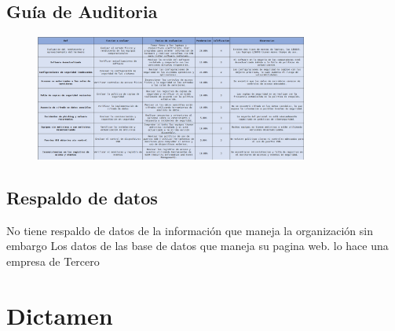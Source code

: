 \documentclass[12pt,a4paper]{article}
\begin{document}
\subsection{Guía de Auditoria }
\begin{figure}[!htb]
    \centering
    \includegraphics[width=0.8\textwidth]{images/guia.png}
    
\end{figure} 
\FloatBarrier 
\subsection{Respaldo de datos}
No tiene respaldo de datos de la información que maneja la organización sin embargo 
Los datos de las base de datos que maneja su pagina web. lo hace una empresa de Tercero

\newpage
\section{Dictamen}

\setlength{\arrayrulewidth}{0.5mm}
\setlength{\tabcolsep}{18pt}
\renewcommand{\arraystretch}{1.5}
\end{document}
